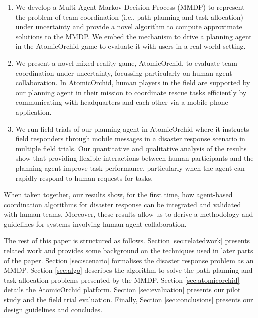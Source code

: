 \begin{enumerate}
\item We develop a Multi-Agent Markov Decision Process (MMDP) to represent the problem of  team coordination  (i.e., path planning and task allocation) under uncertainty \cite{boutilier1996planning} and provide a novel algorithm to compute approximate solutions to the MMDP.  We embed the mechanism to drive a planning  agent in the AtomicOrchid game to evaluate it with users in a real-world setting. 
\item We present a novel mixed-reality game, AtomicOrchid, to evaluate team coordination under uncertainty, focussing particularly on human-agent collaboration. In AtomicOrchid, human players in the field are supported by our planning agent in their mission to coordinate rescue tasks efficiently by communicating with headquarters and each other via a mobile phone application.
\item We run field trials of our planning  agent in AtomicOrchid where it  instructs field responders through mobile messages in a disaster response scenario in multiple field trials. Our quantitative and qualitative analysis of the results show that providing flexible interactions between human participants and the planning agent improve task performance, particularly when the agent can rapidly respond to human requests for tasks. 
\end{enumerate}
When taken together, our results show, for the first time, how agent-based coordination algorithms for disaster response can be integrated and validated with human teams. Moreover, these results allow us to derive a methodology and guidelines  for systems involving  human-agent collaboration. 

The rest of this paper is structured as follows. Section \ref{sec:relatedwork} presents related work and provides some background on the techniques used in later parts of the paper. Section \ref{sec:scenario} formalises the disaster response problem as an MMDP. Section \ref{sec:algo}  describes the algorithm to solve the path planning and task allocation problems presented by the MMDP. Section \ref{sec:atomicorchid}  details the AtomicOrchid platform. Section \ref{sec:evaluation} presents our pilot study and the  field trial evaluation.  Finally, Section \ref{sec:conclusions} presents our design guidelines and concludes.